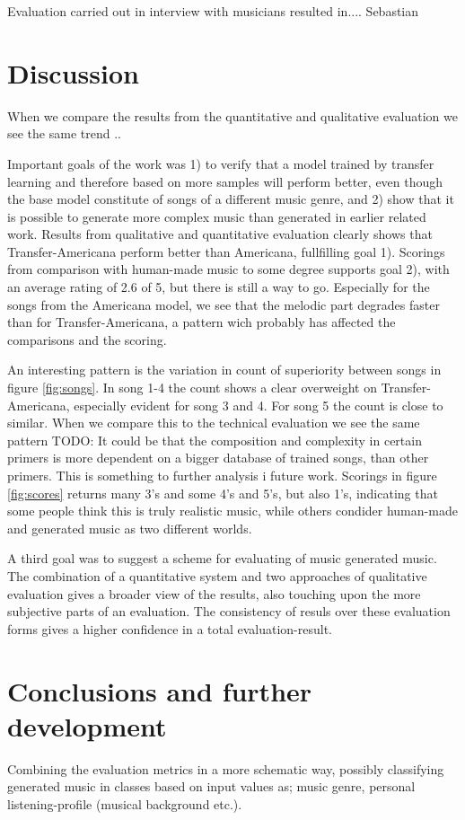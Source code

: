 \documentclass{IEEEtran}
\begin{document}
Evaluation carried out in interview with musicians resulted in.... %
Sebastian

\section{Discussion}

When we compare the results from the quantitative and
qualitative evaluation we see the same trend ..

Important goals of the work was 1) to verify that a model trained by transfer
learning and therefore based on more samples will perform better, even though
the base model constitute of songs of a different music genre, and 2) show
that it is possible to generate more complex music than generated in earlier
related work. Results from qualitative and quantitative evaluation clearly
shows that Transfer-Americana perform better than Americana, fullfilling goal
1). Scorings from comparison with human-made music to some degree supports
goal 2), with an average rating of 2.6 of 5, but there is still a way to go.
Especially for the songs from the Americana model, we see that the melodic
part degrades faster than for Transfer-Americana, a pattern wich probably has
affected the comparisons and the scoring.

An interesting pattern is the variation in count of superiority between songs
in figure \ref{fig:songs}. In song 1-4 the count shows a clear overweight on
Transfer-Americana, especially evident for song 3 and 4. For song 5 the count
is close to similar. When we compare this to the technical evaluation we see
the same pattern TODO: It could be that the composition and complexity in
certain primers is more dependent on a bigger database of trained songs, than
other primers. This is something to further analysis i future work. Scorings
in figure \ref{fig:scores} returns many 3's and some 4's and 5's, but also
1's, indicating that some people think this is truly realistic music, while
others condider human-made and generated music as two different worlds.

A third goal was to suggest a scheme for evaluating of music generated music.
The combination of a quantitative system and two approaches of qualitative
evaluation gives a broader view of the results, also touching upon the more
subjective parts of an evaluation. The consistency of resuls over these
evaluation forms gives a higher confidence in a total evaluation-result.



\section{Conclusions and further development}

Combining the evaluation
metrics in a more schematic way, possibly classifying generated music in
classes based on input values as; music genre, personal listening-profile
(musical background etc.).

\vfill

\pagebreak

\printbibliography
\end{document}

